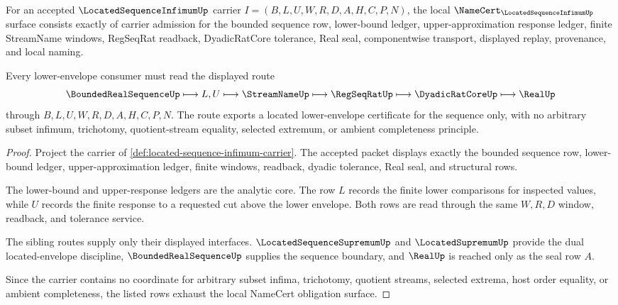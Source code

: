 \begin{theorem}
\label{thm:located-sequence-infimum-namecert-obligations}
For an accepted $\LocatedSequenceInfimumUp$ carrier $I=(B,L,U,W,R,D,A,H,C,P,N)$, the local $\NameCert_{\LocatedSequenceInfimumUp}$ surface consists exactly of carrier admission for the bounded sequence row, lower-bound ledger, upper-approximation response ledger, finite StreamName windows, RegSeqRat readback, DyadicRatCore tolerance, Real seal, componentwise transport, displayed replay, provenance, and local naming.

Every lower-envelope consumer must read the displayed route
$$
\BoundedRealSequenceUp \longmapsto L,U \longmapsto \StreamNameUp \longmapsto \RegSeqRatUp \longmapsto \DyadicRatCoreUp \longmapsto \RealUp
$$
through $B,L,U,W,R,D,A,H,C,P,N$. The route exports a located lower-envelope certificate for the sequence only, with no arbitrary subset infimum, trichotomy, quotient-stream equality, selected extremum, or ambient completeness principle.
\end{theorem}
\begin{proof}
Project the carrier of \autoref{def:located-sequence-infimum-carrier}. The accepted packet displays exactly the bounded sequence row, lower-bound ledger, upper-approximation ledger, finite windows, readback, dyadic tolerance, Real seal, and structural rows.

The lower-bound and upper-response ledgers are the analytic core. The row $L$ records the finite lower comparisons for inspected values, while $U$ records the finite response to a requested cut above the lower envelope. Both rows are read through the same $W,R,D$ window, readback, and tolerance service.

The sibling routes supply only their displayed interfaces. $\LocatedSequenceSupremumUp$ and $\LocatedSupremumUp$ provide the dual located-envelope discipline, $\BoundedRealSequenceUp$ supplies the sequence boundary, and $\RealUp$ is reached only as the seal row $A$.

Since the carrier contains no coordinate for arbitrary subset infima, trichotomy, quotient streams, selected extrema, host order equality, or ambient completeness, the listed rows exhaust the local NameCert obligation surface.
\end{proof}

